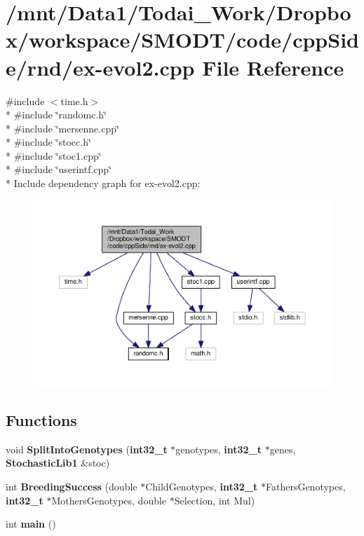 \section{/mnt/\-Data1/\-Todai\-\_\-\-Work/\-Dropbox/workspace/\-S\-M\-O\-D\-T/code/cpp\-Side/rnd/ex-\/evol2.cpp File Reference}
\label{rnd_2ex-evol2_8cpp}
{\ttfamily \#include $<$time.\-h$>$}\\*
{\ttfamily \#include \char`\"{}randomc.\-h\char`\"{}}\\*
{\ttfamily \#include \char`\"{}mersenne.\-cpp\char`\"{}}\\*
{\ttfamily \#include \char`\"{}stocc.\-h\char`\"{}}\\*
{\ttfamily \#include \char`\"{}stoc1.\-cpp\char`\"{}}\\*
{\ttfamily \#include \char`\"{}userintf.\-cpp\char`\"{}}\\*
Include dependency graph for ex-\/evol2.cpp\-:\nopagebreak
\begin{figure}[H]
\begin{center}
\leavevmode
\includegraphics[width=350pt]{rnd_2ex-evol2_8cpp__incl}
\end{center}
\end{figure}
\subsection*{Functions}
\begin{DoxyCompactItemize}
\item 
void {\bf Split\-Into\-Genotypes} ({\bf int32\-\_\-t} $\ast$genotypes, {\bf int32\-\_\-t} $\ast$genes, {\bf Stochastic\-Lib1} \&stoc)
\item 
int {\bf Breeding\-Success} (double $\ast$Child\-Genotypes, {\bf int32\-\_\-t} $\ast$Fathers\-Genotypes, {\bf int32\-\_\-t} $\ast$Mothers\-Genotypes, double $\ast$Selection, int Mul)
\item 
int {\bf main} ()
\end{DoxyCompactItemize}


